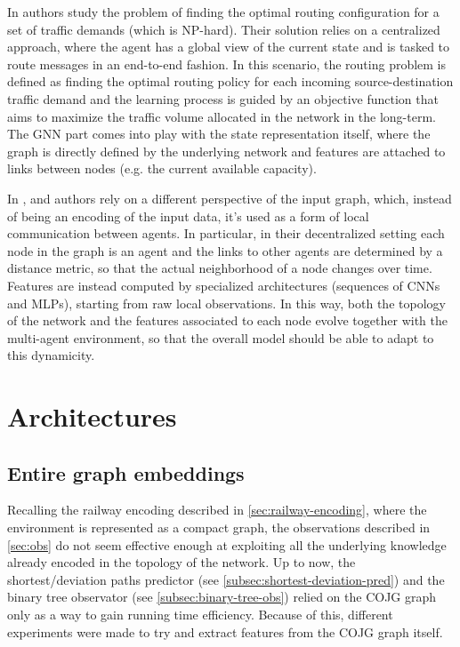 \documentclass[a4paper,10pt]{report}
\begin{document}
In \cite{dqn-gnn-routing} authors study the problem of finding the optimal routing configuration for a set of traffic demands (which is NP-hard). Their solution relies on a centralized approach, where the agent has a global view of the current state and is tasked to route messages in an end-to-end fashion. In this scenario, the routing problem is defined as finding the optimal routing policy for each incoming source-destination traffic demand and the learning process is guided by an objective function that aims to maximize the traffic volume allocated in the network in the long-term. The GNN part comes into play with the state representation itself, where the graph is directly defined by the underlying network and features are attached to links between nodes (e.g. the current available capacity).

In \cite{dgn}, \cite{dqn-gnn-robot} and \cite{magat} authors rely on a different perspective of the input graph, which, instead of being an encoding of the input data, it's used as a form of local communication between agents. In particular, in their decentralized setting each node in the graph is an agent and the links to other agents are determined by a distance metric, so that the actual neighborhood of a node changes over time. Features are instead computed by specialized architectures (sequences of CNNs and MLPs), starting from raw local observations. In this way, both the topology of the network and the features associated to each node evolve together with the multi-agent environment, so that the overall model should be able to adapt to this dynamicity. 

\section{Architectures}
\subsection{Entire graph embeddings}\label{subsec:entire-gnn}
Recalling the railway encoding described in \ref{sec:railway-encoding}, where the environment is represented as a compact graph, the observations described in \ref{sec:obs} do not seem effective enough at exploiting all the underlying knowledge already encoded in the topology of the network. Up to now, the shortest/deviation paths predictor (see \ref{subsec:shortest-deviation-pred}) and the binary tree observator (see \ref{subsec:binary-tree-obs}) relied on the COJG graph only as a way to gain running time efficiency. Because of this, different experiments were made to try and extract features from the COJG graph itself.
\end{document}

